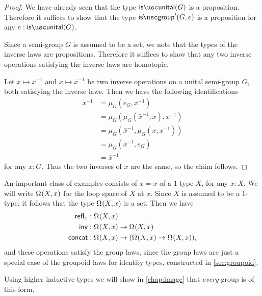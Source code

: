 \begin{proof}
  We have already seen that the type $\isunital(G)$ is a proposition. Therefore it suffices to show that the type $\isgroup'(G,e)$ is a proposition for any $e:\isunital(G)$.

  Since a semi-group $G$ is assumed to be a set, we note that the types of the inverse laws are propositions. Therefore it suffices to show that any two inverse operations satisfying the inverse laws are homotopic.

  Let $x\mapsto x^{-1}$ and $x\mapsto \bar{x}^{-1}$ be two inverse operations on a unital semi-group $G$, both satisfying the inverse laws. Then we have the following identifications
  \begin{align*}
    x^{-1} & = \mu_G(e_G,x^{-1}) \\
    & = \mu_G(\mu_G(\bar{x}^{-1},x),x^{-1}) \\
    & = \mu_G(\bar{x}^{-1},\mu_G(x,x^{-1})) \\
    & = \mu_G(\bar{x}^{-1},e_G) \\
    & = \bar{x}^{-1}
  \end{align*}
  for any $x:G$. Thus the two inverses of $x$ are the same, so the claim follows.
\end{proof}

\begin{eg}
  An important class of examples consists of  $x=x$ of a $1$-type $X$, for any $x:X$. 
  We will write $\Omega^{}(X,x)$ for the loop space of $X$ at $x$. 
  Since $X$ is assumed to be a $1$-type, it follows that the type $\Omega^{}(X,x)$ is a set. Then we have
  \begin{align*}
    \mathsf{refl}_{x} & : \Omega^{}(X,x) \\
    \mathsf{inv} & : \Omega^{}(X,x) \to \Omega^{}(X,x) \\
    \mathsf{concat} & : \Omega^{}(X,x) \to (\Omega^{}(X,x)\to \Omega^{}(X,x)),
  \end{align*}
  and these operations satisfy the group laws, since the group laws are just a special case of the groupoid laws for identity types, constructed in \cref{sec:groupoid}.
  
  Using higher inductive types we will show in \cref{chap:image} that \emph{every} group is of this form.
\end{eg}

